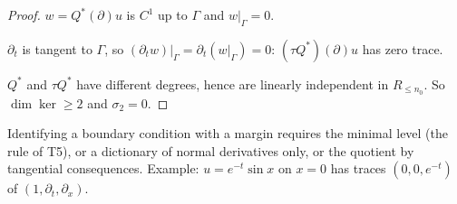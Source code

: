\begin{proof}
$w=Q^*(\partial)u$ is $C^1$ up to $\Gamma$ and $w|_\Gamma=0$.

$\partial_t$ is tangent to $\Gamma$, so $(\partial_tw)|_\Gamma=\partial_t(w|_\Gamma)=0$: $(\tau Q^*)(\partial)u$ has zero trace.

$Q^*$ and $\tau Q^*$ have different degrees, hence are linearly independent in $R_{\le n_0}$. So $\dim\ker\ge2$ and $\sigma_2=0$.

\end{proof}

\begin{caution}[title={Reading}]
Identifying a boundary condition with a margin requires the minimal level (the rule of T5), or a dictionary of normal derivatives only, or the quotient by tangential consequences. Example: $u=e^{-t}\sin x$ on $x=0$ has traces $(0,0,e^{-t})$ of $(1,\partial_t,\partial_x)$.
\end{caution}

